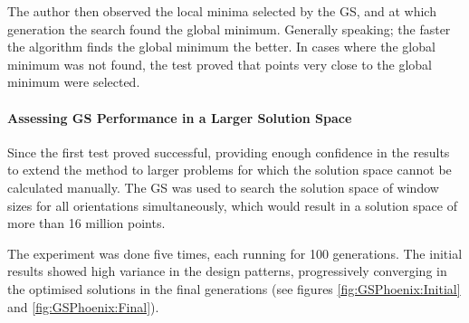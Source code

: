 The author then observed the local minima selected by the GS, and at which generation the search found the global minimum. Generally speaking; the faster the algorithm finds the global minimum the better. In cases where the global minimum was not found, the test proved that points very close to the global minimum were selected.

\paragraph{Assessing GS Performance in a Larger Solution Space}\mbox{}

Since the first test proved successful, providing enough confidence in the results to extend the method to larger problems for which the solution space cannot be calculated manually. The GS was used to search the solution space of window sizes for all orientations simultaneously, which would result in a solution space of more than 16 million points.

The experiment was done five times, each running for 100 generations. The initial results showed high variance in the design patterns, progressively converging in the optimised solutions in the final generations (see figures \ref{fig:GSPhoenix:Initial} and \ref{fig:GSPhoenix:Final}).
\label{sec:GAConvergence}

